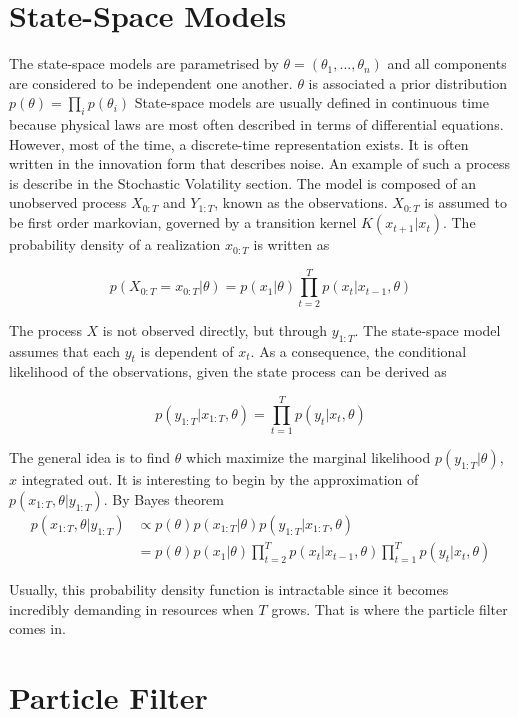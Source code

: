 \documentclass[11pt,a4,twosided,singlespacing,titlepagenumber=on]{scrreprt}
\numberwithin{equation}{chapter} %
\theoremstyle{remark}
\begin{document}
\section{State-Space Models}
The state-space models are parametrised by $\theta = (\theta_1,...,\theta_n)$ and all components are considered to be independent one another. $\theta$ is associated a prior distribution $p(\theta) = \prod_i p(\theta_i)$ State-space models are usually defined in continuous time because physical laws are most often described in terms of differential equations. However, most of the time, a discrete-time representation exists. It is often written in the innovation form that describes noise. An example of such a process is describe in the Stochastic Volatility section. The model is composed of an unobserved process $X_{0:T}$ and $Y_{1:T}$, known as the observations. $X_{0:T}$ is assumed to be first order markovian, governed by a transition kernel $K(x_{t+1}|x_t)$. The probability density of a realization $x_{0:T}$ is written as

$$p(X_{0:T} = x_{0:T} | \theta) = p(x_1|\theta) \prod_{t=2}^T p(x_t|x_{t-1}, \theta) $$

The process $X$ is not observed directly, but through $y_{1:T}$. The state-space model assumes that each $y_t$ is dependent of $x_t$. As a consequence, the conditional likelihood of the observations, given the state process can be derived as

$$p(y_{1:T} | x_{1:T}, \theta) = \prod_{t=1}^T p(y_t | x_t, \theta) $$

The general idea is to find $\theta$ which maximize the marginal likelihood $p(y_{1:T}|\theta)$, $x$ integrated out. It is interesting to begin by the approximation of $p(x_{1:T}, \theta | y_{1:T})$. By Bayes theorem
\begin{align*}
p(x_{1:T}, \theta | y_{1:T}) &\propto p(\theta)p(x_{1:T}|\theta)p(y_{1:T}|x_{1:T}, \theta) \\
 &= p(\theta) p(x_1|\theta) \prod_{t=2}^T p(x_t|x_{t-1}, \theta) \prod_{t=1}^T p(y_t | x_t, \theta)
\end{align*}

\noindent
Usually, this probability density function is intractable since it becomes incredibly demanding in resources when $T$ grows. That is where the particle filter comes in.

\section{Particle Filter}
\end{document}
